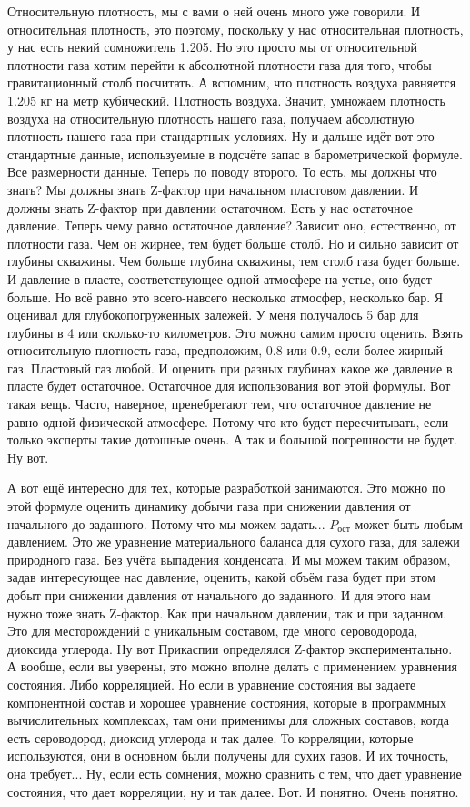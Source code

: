 \documentclass[main.tex]{subfiles}
\begin{document}
Относительную плотность, мы с вами о ней очень много уже говорили.
И относительная плотность, это поэтому, поскольку у нас относительная плотность, у нас есть некий сомножитель 1.205.
Но это просто мы от относительной плотности газа хотим перейти к абсолютной плотности газа для того, чтобы гравитационный столб посчитать.
А вспомним, что плотность воздуха равняется 1.205 кг на метр кубический.
Плотность воздуха.
Значит, умножаем плотность воздуха на относительную плотность нашего газа, получаем абсолютную плотность нашего газа при стандартных условиях.
Ну и дальше идёт вот это стандартные данные, используемые в подсчёте запас в барометрической формуле.
Все размерности данные.
Теперь по поводу второго.
То есть, мы должны что знать?
Мы должны знать Z-фактор при начальном пластовом давлении.
И должны знать Z-фактор при давлении остаточном.
Есть у нас остаточное давление.
Теперь чему равно остаточное давление?
Зависит оно, естественно, от плотности газа.
Чем он жирнее, тем будет больше столб.
Но и сильно зависит от глубины скважины.
Чем больше глубина скважины, тем столб газа будет больше.
И давление в пласте, соответствующее одной атмосфере на устье, оно будет больше.
Но всё равно это всего-навсего несколько атмосфер, несколько бар.
Я оценивал для глубокопогруженных залежей.
У меня получалось 5 бар для глубины в 4 или сколько-то километров.
Это можно самим просто оценить.
Взять относительную плотность газа, предположим, 0.8 или 0.9, если более жирный газ.
Пластовый газ любой.
И оценить при разных глубинах какое же давление в пласте будет остаточное.
Остаточное для использования вот этой формулы.
Вот такая вещь.
Часто, наверное, пренебрегают тем, что остаточное давление не равно одной физической атмосфере.
Потому что кто будет пересчитывать, если только эксперты такие дотошные очень.
А так и большой погрешности не будет.
Ну вот.

А вот ещё интересно для тех, которые разработкой занимаются.
Это можно по этой формуле оценить динамику добычи газа при снижении давления от начального до заданного.
Потому что мы можем задать...
$P_{\text{ост}}$ может быть любым давлением.
Это же уравнение материального баланса для сухого газа, для залежи природного газа.
Без учёта выпадения конденсата.
И мы можем таким образом, задав интересующее нас давление, оценить, какой объём газа будет при этом добыт при снижении давления от начального до заданного.
И для этого нам нужно тоже знать Z-фактор.
Как при начальном давлении, так и при заданном.
Это для месторождений с уникальным составом, где много сероводорода, диоксида углерода.
Ну вот Прикаспии определялся Z-фактор экспериментально.
А вообще, если вы уверены, это можно вполне делать с применением уравнения состояния.
Либо корреляцией.
Но если в уравнение состояния вы задаете компонентной состав и хорошее уравнение состояния, которые в программных вычислительных комплексах, там они применимы для сложных составов, когда есть сероводород, диоксид углерода и так далее.
То корреляции, которые используются, они в основном были получены для сухих газов.
И их точность, она требует...
Ну, если есть сомнения, можно сравнить с тем, что дает уравнение состояния, что дает корреляции, ну и так далее.
Вот. И понятно. Очень понятно.
\end{document}
